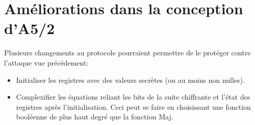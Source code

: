 \section{Améliorations dans la conception d'A5/2}
Plusieurs changements au protocole pourraient permettre de le protéger contre l'attaque vue précédement:
\begin{itemize}
\item{Initialiser les registres avec des valeurs secrètes (ou au moins non nulles).}
\item{Complexifier les équations reliant les bits de la suite chiffrante et l'état des registres après l'initialisation. Ceci peut se faire en choisissant une fonction booléenne de plus haut degré que la fonction Maj.}
\end{itemize}
